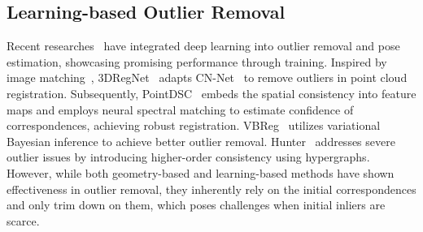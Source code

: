 \subsection{Learning-based Outlier Removal}
Recent researches~\cite{3DRegNet, PointDSC, jiang2023robust} have integrated 
deep learning into outlier removal and pose estimation, 
showcasing promising performance through training. 
Inspired by image matching~\cite{CN-Net}, 3DRegNet~\cite{3DRegNet} adapts CN-Net~\cite{CN-Net} to remove outliers in point cloud registration. Subsequently, PointDSC~\cite{PointDSC} embeds the spatial consistency 
into feature maps and employs neural spectral matching to estimate confidence of correspondences, 
achieving robust registration. VBReg~\cite{jiang2023robust} utilizes variational Bayesian inference 
to achieve better outlier removal. Hunter~\cite{yao2023hunter} addresses severe outlier issues 
by introducing higher-order consistency using hypergraphs. However, while both geometry-based 
and learning-based methods have shown effectiveness in outlier removal, 
they inherently rely on the initial correspondences and only trim down on them, 
which poses challenges when initial inliers are scarce.